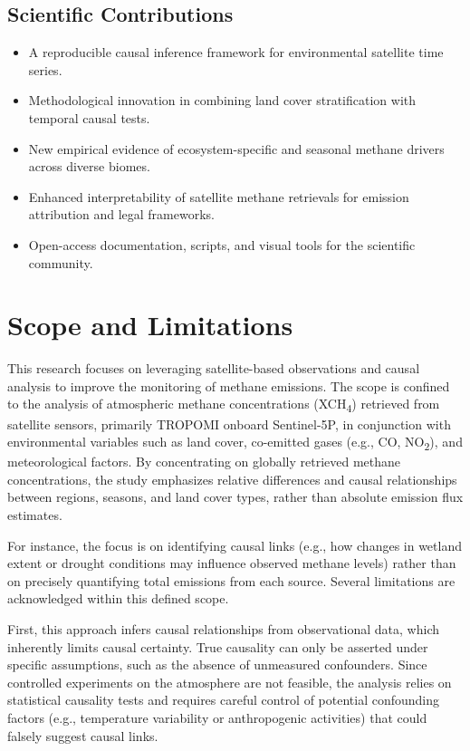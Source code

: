 \subsection{Scientific Contributions}

\begin{itemize}
    \item A reproducible causal inference framework for environmental satellite time series.
    \item Methodological innovation in combining land cover stratification with temporal causal tests.
    \item New empirical evidence of ecosystem-specific and seasonal methane drivers across diverse biomes.
    \item Enhanced interpretability of satellite methane retrievals for emission attribution and legal frameworks.
    \item Open-access documentation, scripts, and visual tools for the scientific community.
\end{itemize}



\section{Scope and Limitations}

This research focuses on leveraging satellite-based observations and causal analysis to improve the monitoring of methane emissions. The scope is confined to the analysis of atmospheric methane concentrations (XCH\textsubscript{4}) retrieved from satellite sensors, primarily TROPOMI onboard Sentinel-5P, in conjunction with environmental variables such as land cover, co-emitted gases (e.g., CO, NO\textsubscript{2}), and meteorological factors. By concentrating on globally retrieved methane concentrations, the study emphasizes relative differences and causal relationships between regions, seasons, and land cover types, rather than absolute emission flux estimates.

For instance, the focus is on identifying causal links (e.g., how changes in wetland extent or drought conditions may influence observed methane levels) rather than on precisely quantifying total emissions from each source. Several limitations are acknowledged within this defined scope.

First, this approach infers causal relationships from observational data, which inherently limits causal certainty. True causality can only be asserted under specific assumptions, such as the absence of unmeasured confounders. Since controlled experiments on the atmosphere are not feasible, the analysis relies on statistical causality tests and requires careful control of potential confounding factors (e.g., temperature variability or anthropogenic activities) that could falsely suggest causal links.


